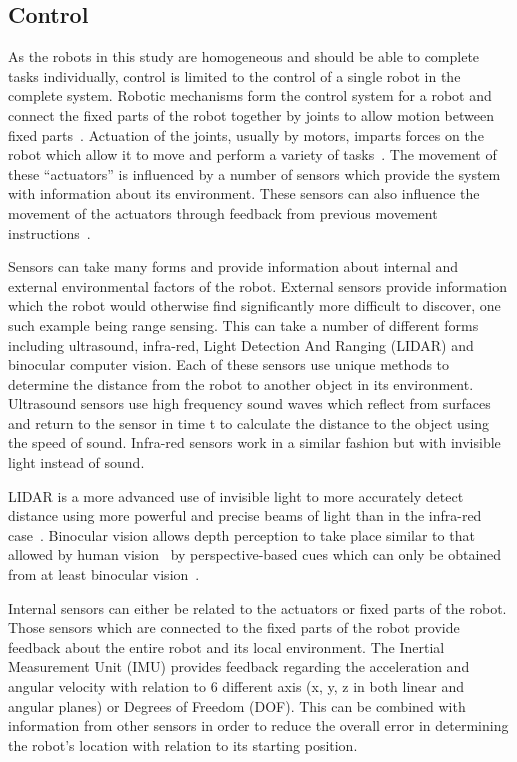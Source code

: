 \subsection{Control}\label{litreview/robotics/control}  
As the robots in this study are homogeneous and should be able to complete 
tasks individually, control is limited to the control of a single robot in 
the complete system. Robotic mechanisms form the control system for a robot 
and connect the fixed parts of the robot together by joints to allow motion 
between fixed parts~\cite{lynch2017modern}. Actuation of the joints, usually 
by motors, imparts forces on the robot which allow it to move and perform a 
variety of tasks~\cite{lynch2017modern}. The movement of these ``actuators'' 
is influenced by a number of sensors which provide the system with information 
about its environment. These sensors can also influence the movement of the 
actuators through feedback from previous movement instructions~\cite{lynch2017modern}.    

Sensors can take many forms and provide information about internal and external 
environmental factors of the robot. External sensors provide information which 
the robot would otherwise find significantly more difficult to discover, one 
such example being range sensing. This can take a number of different forms 
including ultrasound, infra-red, Light Detection And Ranging (LIDAR) and 
binocular computer vision. Each of these sensors use unique methods to determine 
the distance from the robot to another object in its environment. Ultrasound 
sensors use high frequency sound waves which reflect from surfaces and return 
to the sensor in time t to calculate the distance to the object using the speed 
of sound. Infra-red sensors work in a similar fashion but with invisible light 
instead of sound. 

LIDAR is a more advanced use of invisible light to more accurately detect 
distance using more powerful and precise beams of light than in the infra-red 
case~\cite{LIDAR}. Binocular vision allows depth perception to take place similar 
to that allowed by human vision~\cite{read2005early} by perspective-based cues 
which can only be obtained from at least binocular vision~\cite{
pfautz2002depth}. 

Internal sensors can either be related to the actuators or fixed parts of the 
robot. Those sensors which are connected to the fixed parts of the robot provide 
feedback about the entire robot and its local environment. The Inertial 
Measurement Unit (IMU) provides feedback regarding the acceleration and angular 
velocity with relation to 6 different axis (x, y, z in both linear and angular 
planes) or Degrees of Freedom (DOF). This can be combined with information from 
other sensors in order to reduce the overall error in determining the robot's 
location with relation to its starting position.  

